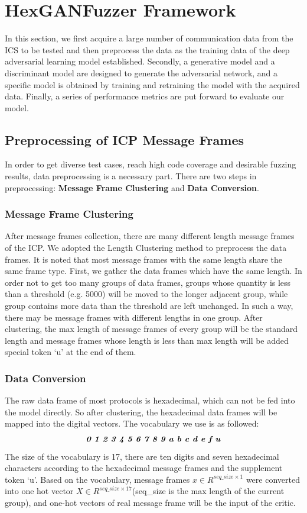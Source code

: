 \section{HexGANFuzzer Framework}
In this section, we first acquire a large number of communication data from the ICS to be tested and then preprocess the data as the training data of the deep adversarial learning model established. Secondly, a generative model and a discriminant model are designed to generate the adversarial network, and a specific model is obtained by training and retraining the model with the acquired data. Finally, a series of performance metrics are put forward to evaluate our model.


\subsection{Preprocessing of ICP Message Frames}
In order to get diverse test cases, reach high code coverage and desirable fuzzing results, data preprocessing is a necessary part. There are two steps in preprocessing: \textbf{Message Frame Clustering} and \textbf{Data Conversion}.

\subsubsection{\textbf{Message Frame Clustering}}
After message frames collection, there are many different length message frames of the ICP. We adopted the Length Clustering method to preprocess the data frames. It is noted that most message frames with the same length share the same frame type. First, we gather the data frames which have the same length. In order not to get too many groups of data frames, groups whose quantity is less than a threshold (e.g. 5000) will be moved to the longer adjacent group, while group contains more data than the threshold are left unchanged. In such a way, there may be message frames with different lengths in one group. After clustering, the max length of message frames of every group will be the standard length and message frames whose length is less than max length will be added special token `u' at the end of them.

\subsubsection{\textbf{Data Conversion}}
The raw data frame of most protocols is hexadecimal, which can not be fed into the model directly. So after clustering, the hexadecimal data frames will be mapped into the digital vectors. The vocabulary we use is as followed:
\begin{equation}
\textit{\textbf{0 1 2 3 4 5 6 7 8 9 a b c d e f u}}
\end{equation}
The size of the vocabulary is 17, there are ten digits and seven hexadecimal characters according to the hexadecimal message frames and the supplement token `u'.
Based on the vocabulary, message frames $x \in R^{seq\_size \times 1}$ were converted into one hot vector $X \in R^{seq\_size \times 17}$(seq\_size is the max length of the current group), and one-hot vectors of real message frame will be the input of the critic.


